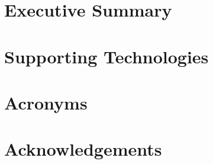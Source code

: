 \documentclass[ %
                author={Ainsley Rutterford},
                supervisor={Dr. Tilo Burghardt},
                degree={MEng},
                title={Volumetric Coral Analysis using Deep Learning},
                subtitle={},
                type={research},
                year={2020} ]{dissertation}
\begin{document}

\maketitle


\frontmatter


\makedecl


\tableofcontents

\chapter*{Executive Summary}


\chapter*{Supporting Technologies}


\chapter*{Acronyms}


\chapter*{Acknowledgements}

\end{document}
